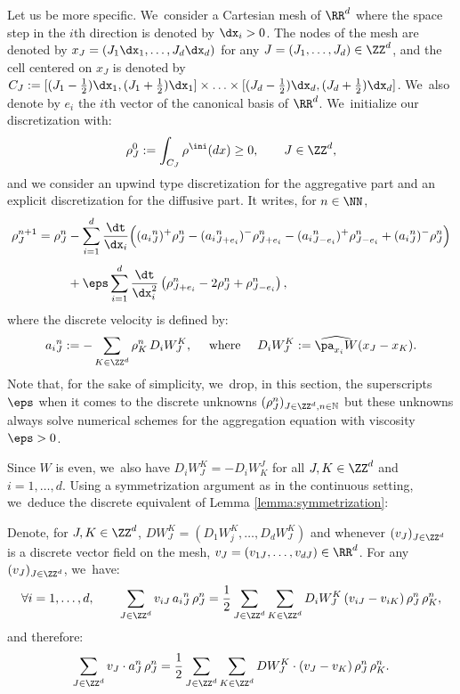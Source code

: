 Let us be more specific. We~consider a Cartesian mesh of $\RR^d$ where the space step in the $i$th direction is denoted by $\dx_i>0$. The nodes of the mesh are denoted by $x_J = (J_1 \dx_1, \ldots, J_d \dx_d)$ for any $J=(J_1, \ldots, J_d)\in \ZZ^d$, and the cell centered on $x_J$ is denoted by $C_J:=[(J_1-\frac 12)\dx_1,(J_1+\frac 12)\dx_1]\times \ldots \times [(J_d-\frac 12)\dx_d,(J_d+\frac 12)\dx_d]$. We~also denote by $e_i$ the $i$th vector of the canonical basis of $\RR^d$. We~initialize our discretization with:
\begin{equation}\label{dis:rho0}
\rho_{J}^0:= \int_{C_J} \rho^{\ini}(dx)\geq 0, \qquad J \in \ZZ^d,
\end{equation}
and we consider an upwind type discretization for the aggregative part \cite{dlv17, lv17, dlv20} and an explicit discretization for the diffusive part. It writes, for $n \in \NN$,
\begin{align}
\rho_{J}^{n+1} = \rho_{J}^n &- \sum_{i=1}^{d} \frac{\dt}{\dx_i}
\Big(({a_i}^n_{J})^+ \rho_{J}^n - ({a_i}^n_{J+e_i})^- \rho_{J+e_i}^n
-({a_i}^n_{J-e_i})^+ \rho_{J-e_i}^n + ({a_i}^n_{J})^- \rho_{J}^n \Big)\notag \\[-5pt]\label{dis:explicit}
\\[-8pt]
& + \eps \sum_{i=1}^{d} \frac{\dt}{\dx_i^2} \left(\rho_{J+e_i}^n - 2\rho_J^n + \rho_{J-e_i}^n \right),\notag
\end{align}
where the discrete velocity is defined by:
\begin{equation}
\label{def:aij}
{a_i}^n_{J} := -\sum_{K\in \ZZ^d} \rho_{K}^n \,D_iW_J^K,
\quad \mbox{ where } \quad
D_iW_J^K := \widehat{\pa_{x_i} W}(x_J-x_K).
\end{equation}
Note that, for the sake of simplicity, we~drop, in this section, the superscripts $\eps$ when it comes to the discrete unknowns $(\rho_J^n)_{J\in \ZZ^d, n \in \mathbb N}$ but these unknowns always solve numerical schemes for the aggregation equation with viscosity $\eps>0$.

Since $W$ is even, we~also have $D_iW_{J}^{K} = -D_iW^{J}_{K}$ for all $J, K \in \ZZ^d$ and $i =1,\ldots,d$. Using a symmetrization argument as in the continuous setting, we~deduce the discrete equivalent of Lemma \ref{lemma:symmetrization}:
\begin{lemma}\label{lemma:symmetrizationDis}
Denote, for $J, K \in \ZZ^d$, $DW_J^K = (D_1W_j^K, \ldots, D_dW_J^K)$ and whenever $(v_J)_{J \in \ZZ^d}$ is a discrete vector field on the mesh, $v_J = (v_{1J}, \ldots, v_{dJ}) \in \RR^d$. For any~$(v_J)_{J \in \ZZ^d}$, we~have:
\[
\forall i=1, \ldots, d, \qquad \sum_{J\in \ZZ^d} v_{iJ} \, {a_i}^n_{J} \, \rho_{J}^n = \frac 12 \sum_{J\in \ZZ^d} \sum_{K\in \ZZ^d} D_iW_J^K \, (v_{iJ} - v_{iK}) \, \rho_{J}^n \, \rho_{K}^n,
\]
and therefore:
\[
\sum_{J\in \ZZ^d} v_{J} \cdot {a}^n_{J} \, \rho_{J}^n = \frac 12 \sum_{J\in \ZZ^d} \sum_{K\in \ZZ^d} DW_J^K \cdot (v_{J} - v_{K}) \, \rho_{J}^n \, \rho_{K}^n.
\]
\end{lemma}

